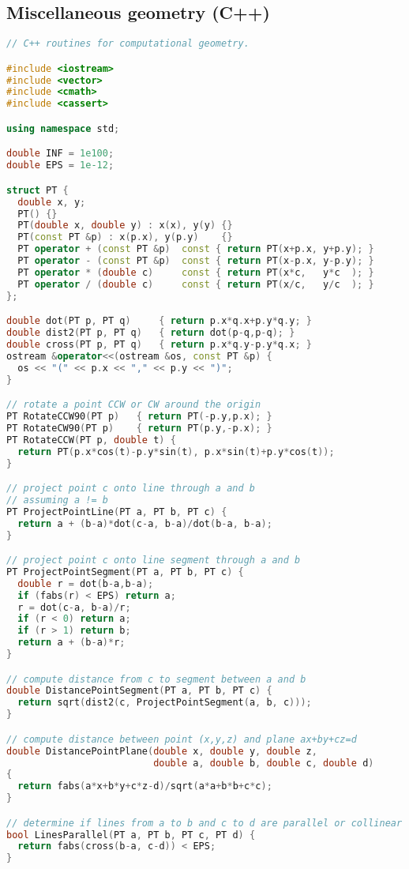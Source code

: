 \subsection{Miscellaneous geometry (C++)}
\begin{lstlisting}[language=C++]
// C++ routines for computational geometry.

#include <iostream>
#include <vector>
#include <cmath>
#include <cassert>

using namespace std;

double INF = 1e100;
double EPS = 1e-12;

struct PT { 
  double x, y; 
  PT() {}
  PT(double x, double y) : x(x), y(y) {}
  PT(const PT &p) : x(p.x), y(p.y)    {}
  PT operator + (const PT &p)  const { return PT(x+p.x, y+p.y); }
  PT operator - (const PT &p)  const { return PT(x-p.x, y-p.y); }
  PT operator * (double c)     const { return PT(x*c,   y*c  ); }
  PT operator / (double c)     const { return PT(x/c,   y/c  ); }
};

double dot(PT p, PT q)     { return p.x*q.x+p.y*q.y; }
double dist2(PT p, PT q)   { return dot(p-q,p-q); }
double cross(PT p, PT q)   { return p.x*q.y-p.y*q.x; }
ostream &operator<<(ostream &os, const PT &p) {
  os << "(" << p.x << "," << p.y << ")"; 
}

// rotate a point CCW or CW around the origin
PT RotateCCW90(PT p)   { return PT(-p.y,p.x); }
PT RotateCW90(PT p)    { return PT(p.y,-p.x); }
PT RotateCCW(PT p, double t) { 
  return PT(p.x*cos(t)-p.y*sin(t), p.x*sin(t)+p.y*cos(t)); 
}

// project point c onto line through a and b
// assuming a != b
PT ProjectPointLine(PT a, PT b, PT c) {
  return a + (b-a)*dot(c-a, b-a)/dot(b-a, b-a);
}

// project point c onto line segment through a and b
PT ProjectPointSegment(PT a, PT b, PT c) {
  double r = dot(b-a,b-a);
  if (fabs(r) < EPS) return a;
  r = dot(c-a, b-a)/r;
  if (r < 0) return a;
  if (r > 1) return b;
  return a + (b-a)*r;
}

// compute distance from c to segment between a and b
double DistancePointSegment(PT a, PT b, PT c) {
  return sqrt(dist2(c, ProjectPointSegment(a, b, c)));
}

// compute distance between point (x,y,z) and plane ax+by+cz=d
double DistancePointPlane(double x, double y, double z,
                          double a, double b, double c, double d)
{
  return fabs(a*x+b*y+c*z-d)/sqrt(a*a+b*b+c*c);
}

// determine if lines from a to b and c to d are parallel or collinear
bool LinesParallel(PT a, PT b, PT c, PT d) { 
  return fabs(cross(b-a, c-d)) < EPS; 
}


\end{lstlisting}
